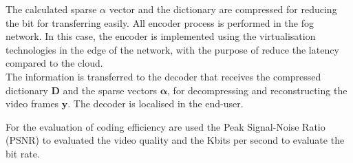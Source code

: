 The calculated sparse $\alpha$ vector and the dictionary are compressed for reducing the bit for transferring easily. All encoder process is performed in the fog network. In this case, the encoder is implemented using the virtualisation technologies in the edge of the network, with the purpose of reduce the latency compared to the cloud. \\

The information is transferred to the decoder that receives the compressed dictionary $\boldsymbol{D}$ and the sparse vectors $\boldsymbol{\alpha}$,  for decompressing and reconstructing the video frames $\boldsymbol{y}$. The decoder is localised in the end-user.

For the evaluation of coding efficiency are used the Peak Signal-Noise Ratio (PSNR) to evaluated the video quality and the Kbits per second to evaluate the bit rate.
 

